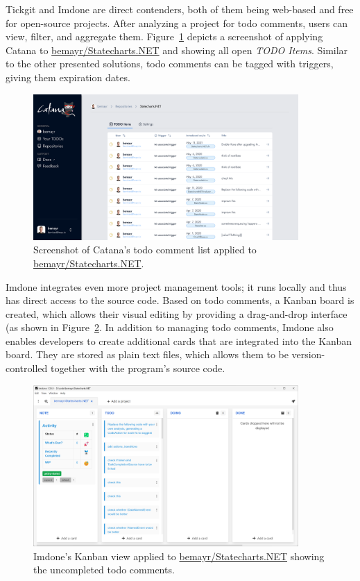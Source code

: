 Tickgit and Imdone are direct contenders, both of them being web-based and free for open-source projects.
After analyzing a project for todo comments, users can view, filter, and aggregate them.
Figure~\ref{fig:catana} depicts a screenshot of applying Catana to \href{https://github.com/bemayr/Statecharts.NET}{bemayr/Statecharts.NET} and showing all open \emph{TODO Items}.
Similar to the other presented solutions, todo comments can be tagged with triggers, giving them expiration dates.
%
\begin{figure}
    \centering
    \includegraphics[width=0.9\textwidth]{images/catana}
    \caption{Screenshot of Catana's todo comment list applied to \href{https://github.com/bemayr/Statecharts.NET}{bemayr/Statecharts.NET}.}
    \label{fig:catana}
\end{figure}

Imdone integrates even more project management tools; it runs locally and thus has direct access to the source code.
Based on todo comments, a Kanban board is created, which allows their visual editing by providing a drag-and-drop interface (as shown in Figure~\ref{fig:imdone}.
In addition to managing todo comments, Imdone also enables developers to create additional cards that are integrated into the Kanban board.
They are stored as plain text files, which allows them to be version-controlled together with the program's source code.
%
\begin{figure}
    \centering
    \includegraphics[width=0.9\textwidth]{images/imdone}
    \caption{Imdone's Kanban view applied to \href{https://github.com/bemayr/Statecharts.NET}{bemayr/Statecharts.NET} showing the uncompleted todo comments.}
    \label{fig:imdone}
\end{figure}

